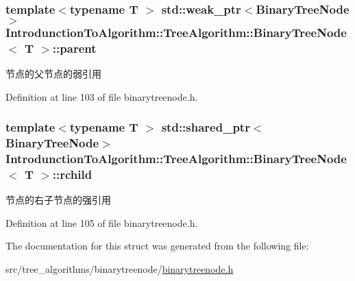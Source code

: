 \subsubsection[{parent}]{\setlength{\rightskip}{0pt plus 5cm}template$<$typename T $>$ std\+::weak\+\_\+ptr$<${\bf Binary\+Tree\+Node}$>$ {\bf Introdunction\+To\+Algorithm\+::\+Tree\+Algorithm\+::\+Binary\+Tree\+Node}$<$ T $>$\+::parent}\label{struct_introdunction_to_algorithm_1_1_tree_algorithm_1_1_binary_tree_node_afa42d2a3e68838d17d1028fab12c71e1}
节点的父节点的弱引用 

Definition at line 103 of file binarytreenode.\+h.

\hypertarget{struct_introdunction_to_algorithm_1_1_tree_algorithm_1_1_binary_tree_node_ae6dc3c9fce595c08cd3a31dba534fec3}{}
\subsubsection[{rchild}]{\setlength{\rightskip}{0pt plus 5cm}template$<$typename T $>$ std\+::shared\+\_\+ptr$<${\bf Binary\+Tree\+Node}$>$ {\bf Introdunction\+To\+Algorithm\+::\+Tree\+Algorithm\+::\+Binary\+Tree\+Node}$<$ T $>$\+::rchild}\label{struct_introdunction_to_algorithm_1_1_tree_algorithm_1_1_binary_tree_node_ae6dc3c9fce595c08cd3a31dba534fec3}
节点的右子节点的强引用 

Definition at line 105 of file binarytreenode.\+h.



The documentation for this struct was generated from the following file\+:\begin{DoxyCompactItemize}
\item 
src/tree\+\_\+algorithms/binarytreenode/\hyperlink{binarytreenode_8h}{binarytreenode.\+h}\end{DoxyCompactItemize}
